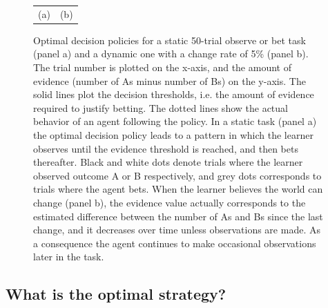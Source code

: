 \documentclass[authoryear]{elsarticle}
\newcommand{\subsectionX}[1]{\subsection{#1}}
\begin{document}
\begin{figure}[t]
\begin{center}
\begin{tabular}{cc}
(a) & (b)
\end{tabular}
\caption{Optimal decision policies for a static 50-trial observe or bet task (panel a) and a dynamic one with a change rate of 5\% (panel b). The trial number is plotted on the x-axis, and the amount of evidence (number of As minus number of Bs) on the y-axis. The solid lines plot the decision thresholds, i.e. the amount of evidence required to justify betting. The dotted lines show the actual behavior of an agent following the policy. In a static task (panel a) the optimal decision policy leads to a pattern in which the learner observes until the evidence threshold is reached, and then bets thereafter. Black and white dots denote trials where the learner observed outcome A or B respectively, and grey dots corresponds to trials where the agent bets. When the learner believes the world can change (panel b), the evidence value actually corresponds to the estimated difference between the number of As and Bs since the last change, and it decreases over time unless observations are made. As a consequence the agent continues to make occasional observations later in the task.}
\label{fig:behavior}
\end{center}
\end{figure}

\subsectionX{What is the optimal strategy?}
\end{document}
